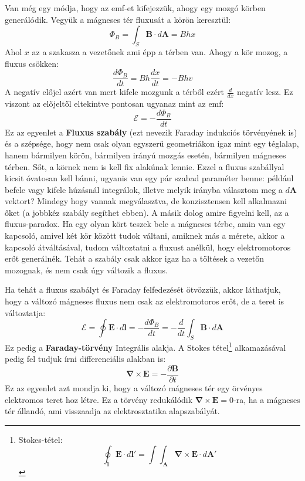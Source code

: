 \documentclass[../main.tex]{subfiles}
\begin{document}
Van még egy módja, hogy az emf-et kifejezzük, ahogy egy mozgó körben generálódik. Vegyük a mágneses tér fluxusát a körön keresztül:
\begin{equation}
    \Phi_B = \int_S \mathbf{B} \cdot d\mathbf{A} = B hx
\end{equation}
Ahol $x$ az a szakasza a vezetőnek ami épp a térben van. Ahogy a kör mozog, a fluxus csökken:
\begin{equation}
    \frac{d\Phi_B}{dt} = B h \frac{dx}{dt} = - B h v
\end{equation}
A negatív előjel azért van mert kifele mozgunk a térből ezért $\frac{d}{dx}$ negatív lesz. Ez viszont az előjeltől eltekintve pontosan ugyanaz mint az emf:
\begin{equation}
    \boxed{\mathcal{E} = - \frac{d\Phi_B}{dt}}
\end{equation}
Ez az egyenlet a \textbf{Fluxus szabály} (ezt nevezik Faraday indukciós törvényének is) és a szépsége, hogy nem csak olyan egyszerű geometriákon igaz mint egy téglalap, hanem bármilyen körön, bármilyen irányú mozgás esetén, bármilyen mágneses térben. Sőt, a körnek nem is kell fix alakúnak lennie.
Ezzel a fluxus szabállyal kicsit óvatosan kell bánni, ugyanis van egy pár szabad paraméter benne: például befele vagy kifele húzásnál integrálok, illetve melyik irányba választom meg a $d\mathbf{A}$ vektort? Mindegy hogy vannak megválasztva, de konzisztensen kell alkalmazni őket (a jobbkéz szabály segíthet ebben).
A másik dolog amire figyelni kell, az a fluxus-paradox. Ha egy olyan kört teszek bele a mágneses térbe, amin van egy kapcsoló, amivel két kör között tudok váltani, amiknek más a mérete, akkor a kapcsoló átváltásával,
tudom változtatni a fluxust anélkül, hogy elektromotoros erőt generálnék. Tehát a szabály csak akkor igaz ha a töltések a vezetőn mozognak, és nem csak úgy változik a fluxus.

Ha tehát a fluxus szabályt és Faraday felfedezését ötvözzük, akkor láthatjuk, hogy a változó mágneses fluxus nem csak az elektromotoros erőt, de a teret is változtatja:
\begin{equation}
    \mathcal{E} = \oint \mathbf{E} \cdot d\mathbf{l} = - \frac{d\Phi_B}{dt} = - \frac{d}{dt} \int_S \mathbf{B} \cdot d\mathbf{A}
\end{equation}
Ez pedig a \textbf{Faraday-törvény} Integrális alakja. A Stokes tétel\footnote{
    Stokes-tétel:
    \begin{equation}
        \oint_\mathbf{l} \mathbf{E} \cdot d\mathbf{l}' = \int \int_\mathbf{A} \boldsymbol{\nabla} \times \mathbf{E} \cdot d\mathbf{A}'
    \end{equation}
} alkamazásával pedig fel tudjuk írni differenciális alakban is:
\begin{equation}
    \boxed{\boldsymbol{\nabla} \times \mathbf{E} = - \frac{\partial \mathbf{B}}{\partial t}}
\end{equation}
Ez az egyenlet azt mondja ki, hogy a változó mágneses tér egy örvényes elektromos teret hoz létre. 
Ez a törvény redukálódik $\boldsymbol{\nabla} \times \mathbf{E} = 0$-ra, ha a mágneses tér állandó, ami visszaadja az elektrosztatika alapszabályát.
\end{document}
